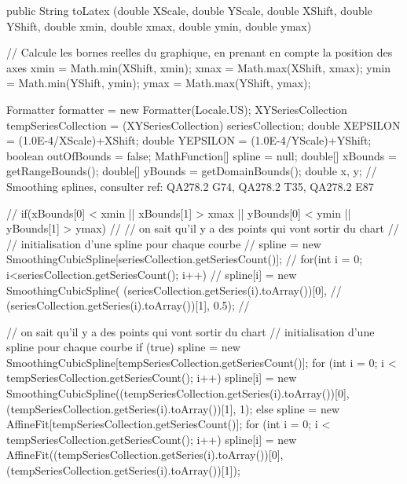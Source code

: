\begin{code}

   public String toLatex (double XScale, double YScale,
                          double XShift, double YShift,
                          double xmin, double xmax,
                          double ymin, double ymax)\begin{hide} {

      // Calcule les bornes reelles du graphique, en prenant en compte la position des axes
      xmin = Math.min(XShift, xmin);
      xmax = Math.max(XShift, xmax);
      ymin = Math.min(YShift, ymin);
      ymax = Math.max(YShift, ymax);

      Formatter formatter = new Formatter(Locale.US);
      XYSeriesCollection tempSeriesCollection = (XYSeriesCollection) seriesCollection;
      double XEPSILON = (1.0E-4/XScale)+XShift;
      double YEPSILON = (1.0E-4/YScale)+YShift;
      boolean outOfBounds = false;
      MathFunction[] spline = null;
      double[] xBounds = getRangeBounds();
      double[] yBounds = getDomainBounds();
      double x, y;
// Smoothing splines, consulter  ref: QA278.2 G74, QA278.2 T35, QA278.2 E87

//       if(xBounds[0] < xmin || xBounds[1] > xmax || yBounds[0] < ymin || yBounds[1] > ymax) {
//          // on sait qu'il y a des points qui vont sortir du chart
//          // initialisation d'une spline pour chaque courbe
//          spline = new SmoothingCubicSpline[seriesCollection.getSeriesCount()];
//          for(int i = 0; i<seriesCollection.getSeriesCount(); i++)
//             spline[i] = new SmoothingCubicSpline(  (seriesCollection.getSeries(i).toArray())[0],
//                                                    (seriesCollection.getSeries(i).toArray())[1], 0.5);
//       }

      // on sait qu'il y a des points qui vont sortir du chart
      // initialisation d'une spline pour chaque courbe
      if (true) {
         spline = new SmoothingCubicSpline[tempSeriesCollection.getSeriesCount()];
         for (int i = 0; i < tempSeriesCollection.getSeriesCount(); i++)
            spline[i] = new SmoothingCubicSpline((tempSeriesCollection.getSeries(i).toArray())[0],
                                                 (tempSeriesCollection.getSeries(i).toArray())[1], 1);
      } else {
         spline = new AffineFit[tempSeriesCollection.getSeriesCount()];
         for (int i = 0; i < tempSeriesCollection.getSeriesCount(); i++)
            spline[i] = new AffineFit((tempSeriesCollection.getSeries(i).toArray())[0],
                                      (tempSeriesCollection.getSeries(i).toArray())[1]);
      }

}
\end{hide}
\end{code}
